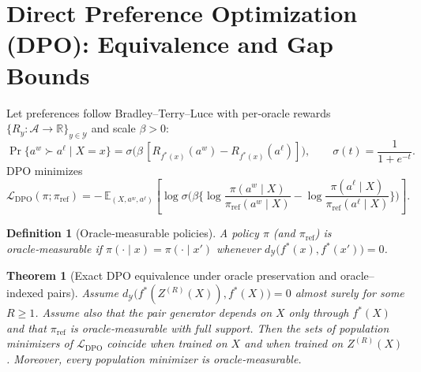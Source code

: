 \documentclass[11pt]{article}
\newtheorem{definition}{Definition}
\newtheorem{theorem}{Theorem}
\newcommand{\Y}{\mathcal{Y}}               %
\newcommand{\A}{\mathcal{A}}               %
\newcommand{\fstar}{f^*}               %
\newcommand{\Gstar}{\mathcal{G}^\star}     %
\newcommand{\E}{\mathbb{E}}
\newcommand{\metric}{d_{\Y}}
\newcommand{\R}{\mathbb{R}}
\begin{document}


\section{Direct Preference Optimization (DPO): Equivalence and Gap Bounds}
\label{sec:dpo}

Let preferences follow Bradley–Terry–Luce with per‑oracle rewards $\{R_y:\A\to\R\}_{y\in\Y}$ and scale $\beta>0$:
\[
\Pr\{a^w\succ a^\ell\mid X=x\}=\sigma\!\Big(\beta\,[R_{\fstar(x)}(a^w)-R_{\fstar(x)}(a^\ell)]\Big),
\qquad \sigma(t)=\frac{1}{1+e^{-t}}.
\]
DPO minimizes
\[
\mathcal L_{\mathrm{DPO}}(\pi;\pi_{\mathrm{ref}})=
-\,\E_{(X,a^w,a^\ell)}\!\left[\log \sigma\!\Big(\beta\Big\{\log\frac{\pi(a^w\mid X)}{\pi_{\mathrm{ref}}(a^w\mid X)}-\log\frac{\pi(a^\ell\mid X)}{\pi_{\mathrm{ref}}(a^\ell\mid X)}\Big\}\Big)\right].
\]

\begin{definition}[Oracle‑measurable policies]
A policy $\pi$ (and $\pi_{\mathrm{ref}}$) is oracle‑measurable if $\pi(\cdot\mid x)=\pi(\cdot\mid x')$ whenever $\metric\!\big(\fstar(x),\fstar(x')\big)=0$.
\end{definition}

\begin{theorem}[Exact DPO equivalence under oracle preservation and oracle–indexed pairs]\label{thm:dpo-exact}
Assume $\metric\!\big(\fstar(Z^{(R)}(X)),\fstar(X)\big)=0$ almost surely for some $R\ge1$. Assume also that the pair generator depends on $X$ only through $\fstar(X)$ and that $\pi_{\mathrm{ref}}$ is oracle‑measurable with full support. Then the sets of population minimizers of $\mathcal L_{\mathrm{DPO}}$ coincide when trained on $X$ and when trained on $Z^{(R)}(X)$. Moreover, every population minimizer is oracle‑measurable.
\end{theorem}
\end{document}
